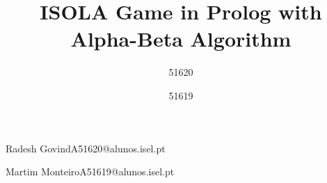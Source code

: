 \def\thetitle{%
  ISOLA Game in Prolog with Alpha-Beta Algorithm
}
\def\theauthor{%
  RG/MM
}

\title{ \thetitle }

\author{51620}{Radesh Govind}{A51620@alunos.isel.pt}
\author{51619}{Martim Monteiro}{A51619@alunos.isel.pt}


